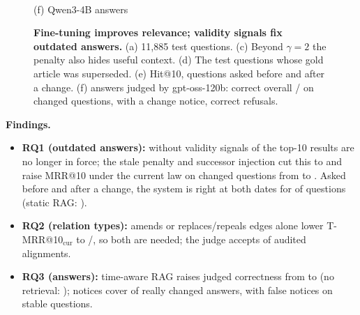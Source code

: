 \documentclass{article} %
\begin{document}
\begin{figure}[H]
\begin{minipage}[t]{0.325\linewidth}
\\[-0.5mm]
{\footnotesize (f) Qwen3-4B answers}
\end{minipage}
\vspace{-1mm}
\caption{\textbf{Fine-tuning improves relevance; validity signals fix outdated answers.} (a) 11,885 test questions.
(c) Beyond $\gamma{=}2$ the penalty also hides useful context. (d) The \ResNTemporal{} test questions whose gold article
was superseded. (e) Hit@10, \ResNTt{} questions asked before and after a change. (f) \ResNAns{} answers judged by
gpt-oss-120b: correct overall / on changed questions, with a change notice, correct refusals.}
\label{fig:results}
\vspace{-2mm}
\end{figure}

\begin{table}[H]
\centering
\caption{Validity signals (fine-tuned models, test). ``cur'': gold replaced by its successor if superseded; T: changed
questions; Stale@10: share of the top 10 not in force on 23/11/2026; \ResWeights{} chosen on validation.}
\label{tab:abl}
\setlength{\tabcolsep}{5pt}
\vspace{-2mm}
\end{table}

\textbf{Findings.}
\begin{itemize}[leftmargin=1.2em, itemsep=0pt, topsep=1pt]
\item \textbf{RQ1 (outdated answers):} without validity signals \ResStaleNoTimePct{} of the top-10 results are no longer in
force; the stale penalty and successor injection cut this to \ResStaleTimePct{} and raise MRR@10 under the current law on
changed questions from \ResTmrrNoTime{} to \ResTmrrTime. Asked before and after a change, the system is right at both dates for \ResTtBothPct{} of questions (static RAG: \ResTtStaticBothPct).
\item \textbf{RQ2 (relation types):} amends or replaces/repeals edges alone lower T-MRR@10$_\text{cur}$ to
\ResTmrrAmends/\ResTmrrRepl, so both are needed; the judge accepts \ResAlignAccPct{} of audited alignments.
\item \textbf{RQ3 (answers):} time-aware RAG raises judged correctness from \ResAnsPlainCorrect{} to \ResAnsCorrect{}
(no retrieval: \ResAnsNoneCorrectPct); notices cover \ResAnsNoticeRecallPct{} of really changed answers, with
\ResAnsFalseAlarmPct{} false notices on stable questions.
\end{itemize}
\end{document}
